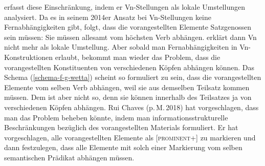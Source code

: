\begin{exe}
\begin{xlist}
 erfasst diese Einschränkung, indem er Vn-Stellungen als lokale
Umstellungen analysiert. Da es in seinem 2014er Ansatz bei Vn-Stellungen keine Fernabhängigkeiten
gibt, folgt, dass die vorangestellten Elemente Satzgenossen sein müssen: Sie müssen allesamt vom
höchsten Verb abhängen. 
\citet{Wetta2018a} erklärt dann Vn nicht mehr als lokale Umstellung. Aber
sobald man Fernabhängigkeiten in Vn-Konstruktionen erlaubt, bekommt man wieder das Problem, dass die
vorangestellten Konstituenten von verschiedenen Köpfen abhängen können. Das Schema
(\ref{schema-f-g-wetta}) scheint so formuliert zu sein, dass die vorangestellten Elemente vom selben
Verb abhängen, weil sie aus demselben Teilsatz kommen müssen. Dem ist aber nicht so, denn sie können
innerhalb des Teilsatzes ja von verschiedenen Köpfen abhängen. Rui Chaves (p.\,M.\,2018) hat
vorgeschlagen, dass man das Problem beheben könnte, indem man informationsstrukturelle
Beschränkungen bezüglich des vorangestellten Materials formuliert. Er hat vorgeschlagen, alle
vorangestellten Elemente als [\textsc{prominent}+] zu markieren und dann festzulegen, dass alle
Elemente mit solch einer Markierung vom selben semantischen Prädikat abhängen müssen. 
%

\end{xlist}
\end{exe}
